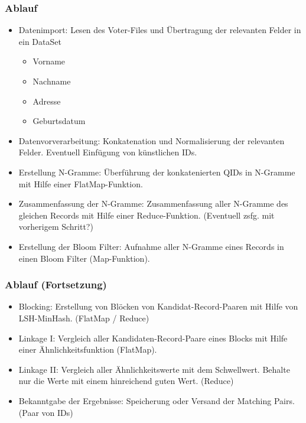 \documentclass{beamer}
\begin{document}
    \begin{frame}
    		\frametitle{Ablauf}  

		\begin{itemize}
			\item Datenimport: Lesen des Voter-Files und Übertragung der relevanten Felder in
			 ein DataSet
			\begin{itemize}
				\item Vorname
				\item Nachname
				\item Adresse
				\item Geburtsdatum
			\end{itemize}
			\item Datenvorverarbeitung: Konkatenation und Normalisierung der relevanten
			 Felder. Eventuell Einfügung von künstlichen IDs.
			\item Erstellung N-Gramme: Überführung der konkatenierten QIDs in N-Gramme mit
			 Hilfe einer FlatMap-Funktion.
			\item Zusammenfassung der N-Gramme: Zusammenfassung aller N-Gramme des
			 gleichen Records mit Hilfe einer Reduce-Funktion. (Eventuell zsfg. mit vorherigem
			  Schritt?)
			\item Erstellung der Bloom Filter: Aufnahme aller N-Gramme eines Records in einen
			 Bloom Filter (Map-Funktion).
		\end{itemize}
		
    \end{frame}

    \begin{frame}
    		\frametitle{Ablauf (Fortsetzung)}
    
    		\begin{itemize}
        		\item Blocking: Erstellung von Blöcken von Kandidat-Record-Paaren mit Hilfe von
        		 LSH-MinHash. (FlatMap / Reduce)
			\item Linkage I: Vergleich aller Kandidaten-Record-Paare eines Blocks mit Hilfe einer
			 Ähnlichkeitsfunktion (FlatMap).
			\item Linkage II: Vergleich aller Ähnlichkeitswerte mit dem Schwellwert. Behalte nur
			 die Werte mit einem hinreichend guten Wert. (Reduce)
			\item Bekanntgabe der Ergebnisse: Speicherung oder Versand der Matching Pairs.
			 (Paar von IDs)
		\end{itemize}
    \end{frame}
\end{document}
